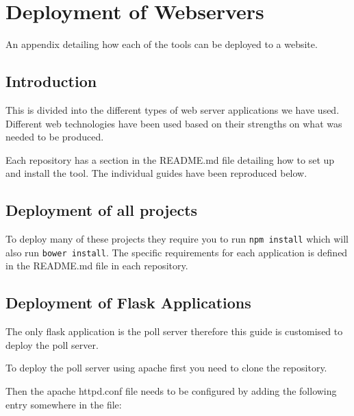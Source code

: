 \chapter{Deployment of Webservers} \label{Chapter:Deployment of Webservers}
An appendix detailing how each of the tools can be deployed to a website.

\begin{preamble}
\end{preamble}

\section{Introduction}

This is divided into the different types of web server applications we have used. Different web technologies have been used based on their strengths on what was needed to be produced.

Each repository has a section in the README.md file detailing how to set up and install the tool. The individual guides have been reproduced below.

\section{Deployment of all projects}

To deploy many of these projects they require you to run \lstinline|npm install| which will also run \lstinline|bower install|. The specific requirements for each application is defined in the README.md file in each repository.

\section{Deployment of Flask Applications} \label{Section:Deployment Flask Applications}

The only flask application is the poll server therefore this guide is customised to deploy the poll server.

To deploy the poll server using apache first you need to clone the repository.

Then the apache httpd.conf file needs to be configured by adding the following entry somewhere in the file:

